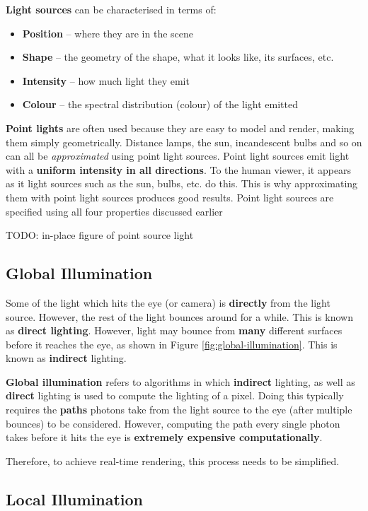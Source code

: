 \documentclass{article}
\begin{document}
\textbf{Light sources} can be characterised in terms of:
\begin{itemize}
	\item \textbf{Position} -- where they are in the scene
	\item \textbf{Shape} -- the geometry of the shape, what it looks like, its surfaces, etc.
	\item \textbf{Intensity} -- how much light they emit
	\item \textbf{Colour} -- the spectral distribution (colour) of the light emitted
\end{itemize}

\textbf{Point lights} are often used because they are easy to model and render, making them simply geometrically. Distance lamps, the sun, incandescent bulbs and so on can all be \textit{approximated} using point light sources. Point light sources emit light with a \textbf{uniform intensity in all directions}. To the human viewer, it appears as it light sources such as the sun, bulbs, etc. do this. This is why approximating them with point light sources produces good results. Point light sources are specified using all four properties discussed earlier

TODO: in-place figure of point source light

\subsection{Global Illumination}

Some of the light which hits the eye (or camera) is \textbf{directly} from the light source. However, the rest of the light bounces around for a while. This is known as \textbf{direct lighting}. However, light may bounce from \textbf{many} different surfaces before it reaches the eye, as shown in Figure \ref{fig:global-illumination}. This is known as \textbf{indirect} lighting.

\textbf{Global illumination} refers to algorithms in which \textbf{indirect} lighting, as well as \textbf{direct} lighting is used to compute the lighting of a pixel. Doing this typically requires the \textbf{paths} photons take from the light source to the eye (after multiple bounces) to be considered. However, computing the path every single photon takes before it hits the eye is \textbf{extremely expensive computationally}.

Therefore, to achieve real-time rendering, this process needs to be simplified.

\subsection{Local Illumination}
\end{document}
